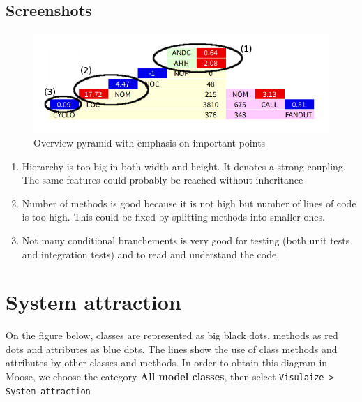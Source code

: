 \subsection{Screenshots}

\begin{figure}[H]
    \includegraphics[width=\textwidth]{OverviewPyramid_annotated.png}
    \caption{\label{fig:pyramid}Overview pyramid with emphasis on important points}
\end{figure}

\begin{enumerate}
    \item Hierarchy is too big in both width and height. It denotes a strong coupling. The same features could probably be reached without inheritance
    \item Number of methods is good because it is not high but number of lines of code is too high. This could be fixed by splitting methods into smaller ones.
    \item Not many conditional branchements is very good for testing (both unit tests and integration tests) and to read and understand the code.
\end{enumerate}

\section{System attraction}
On the figure below, classes are represented as big black dots, methods as red dots and attributes as blue dots. The lines show the use of class methods and attributes by other classes and methods. In order to obtain this diagram in Moose, we choose the category \textbf{All model classes}, then select \texttt{Visulaize > System attraction}

